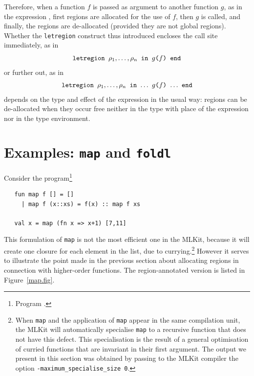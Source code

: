 \documentclass[12pt]{book}
\begin{document}
Therefore, when a function $f$ is passed as argument to another
function $g$, as in the expression , first regions are
allocated for the use of $f$, then $g$ is called, and finally, the
regions are de-allocated (provided they are not global regions).
Whether the {\tt letregion} construct thus introduced encloses the
call site immediately, as in
$$\hbox{\tt letregion $\rho_1,\ldots,\rho_n$ in $g$($f$) end}$$
or further out, as in
$$\hbox{\tt letregion $\rho_1,\ldots,\rho_n$ in $\ldots$ $g$($f$)
  $\ldots$ end}$$
depends on the type and effect of the expression
 in the usual way: regions can be de-allocated when
they occur free neither in the type with place of the expression
nor in the type environment.

\section{Examples: \texttt{map} and \texttt{foldl}}
Consider the program\footnote{Program .}
\begin{verbatim}
   fun map f [] = []
     | map f (x::xs) = f(x) :: map f xs
   
   val x = map (fn x => x+1) [7,11]
\end{verbatim}
This formulation of {\tt map} is not the most efficient one in the
MLKit, because it will create one closure for each element in the
list, due to currying.\footnote{When {\tt map} and the application of
  {\tt map} appear in the same compilation unit, the MLKit will
  automatically specialise {\tt map} to a recursive function that does
  not have this defect. This specialisation is the result of a general
  optimisation of curried functions that are invariant in their first
  argument. The output we present in this section was obtained by
  passing to the MLKit compiler the option
  \texttt{-maximum\_specialise\_size 0}.} However it serves to
illustrate the point made in the previous section about allocating
regions in connection with higher-order functions. The
region-annotated version is listed in Figure~\ref{map.fig}.
\end{document}
